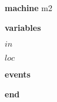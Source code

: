 \begin{block}
  \item   \textbf{machine} m2
  \item   \textbf{variables}
  \begin{block}
    \item   $in$
    \item   $loc$
  \end{block}
  \item   
  \item   
  \item   
  \item   
  \item   \textbf{events}
  \begin{block}
    \item   
    \item   
    \item   
    \item   
  \end{block}
  \item   \textbf{end} \\
\end{block}
